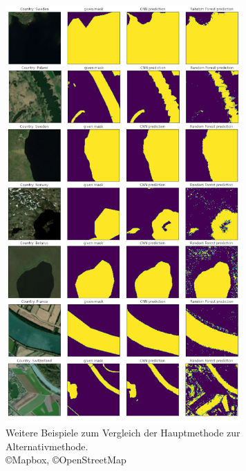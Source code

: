 \begin{figure}
    \centering
    \includegraphics[width=0.8\textwidth]{images/bsp.png}
    \caption{Weitere Beispiele zum Vergleich der Hauptmethode zur Alternativmethode.\\ \copyright Mapbox, \copyright OpenStreetMap}
    \label{fig:bsp}
\end{figure}

